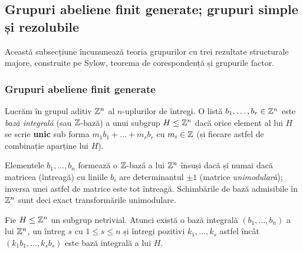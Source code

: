 \subsection{Grupuri abeliene finit generate; grupuri simple și rezolubile}\label{sec:avansat3}

Această subsecțiune încununează teoria grupurilor cu trei rezultate structurale majore, construite pe Sylow, teorema de corespondență și grupurile factor.

\subsubsection*{Grupuri abeliene finit generate}

Lucrăm în grupul aditiv $\mathbb{Z}^n$ al $n$-uplurilor de întregi. O listă $b_1,\dots,b_r\in\mathbb{Z}^n$ este \emph{bază integrală} (sau $\mathbb{Z}$-bază) a unui subgrup $H\le\mathbb{Z}^n$ dacă orice element al lui $H$ se scrie \textbf{unic} sub forma $m_1b_1+\dots+m_rb_r$ cu $m_i\in\mathbb{Z}$ (și fiecare astfel de combinație aparține lui $H$).

\begin{observatie}
Elementele $b_1,\dots,b_n$ formează o $\mathbb{Z}$-bază a lui $\mathbb{Z}^n$ însuși dacă și numai dacă matricea (întreagă) cu liniile $b_i$ are determinantul $\pm1$ (matrice \emph{unimodulară}); inversa unei astfel de matrice este tot întreagă. Schimbările de bază admisibile în $\mathbb{Z}^n$ sunt deci exact transformările unimodulare.
\end{observatie}

\begin{teorema}\label{teo:adaptata}
Fie $H\le\mathbb{Z}^n$ un subgrup netrivial. Atunci există o bază integrală $(b_1,\dots,b_n)$ a lui $\mathbb{Z}^n$, un întreg $s$ cu $1\le s\le n$ și întregi pozitivi $k_1,\dots,k_s$ astfel încât $(k_1b_1,\dots,k_sb_s)$ este bază integrală a lui $H$.
\end{teorema}

